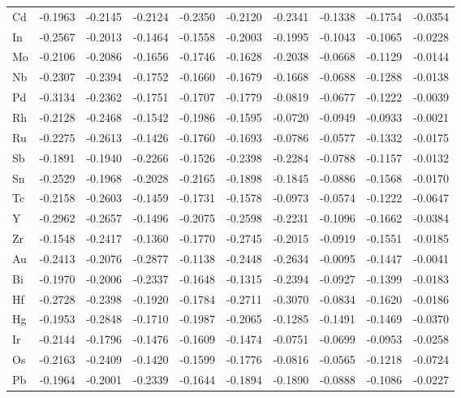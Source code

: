 \documentclass[a4paper, 12pt]{article}
\begin{document}
\begin{table}[htbp]
{\begin{tabular}{l *{9}{l}}
        Cd & -0.1963 & -0.2145 & -0.2124 & -0.2350 & -0.2120 & -0.2341 & -0.1338 & -0.1754 & -0.0354 \\
        In & -0.2567 & -0.2013 & -0.1464 & -0.1558 & -0.2003 & -0.1995 & -0.1043 & -0.1065 & -0.0228 \\
        Mo & -0.2106 & -0.2086 & -0.1656 & -0.1746 & -0.1628 & -0.2038 & -0.0668 & -0.1129 & -0.0144 \\
        Nb & -0.2307 & -0.2394 & -0.1752 & -0.1660 & -0.1679 & -0.1668 & -0.0688 & -0.1288 & -0.0138 \\
        Pd & -0.3134 & -0.2362 & -0.1751 & -0.1707 & -0.1779 & -0.0819 & -0.0677 & -0.1222 & -0.0039 \\
        Rh & -0.2128 & -0.2468 & -0.1542 & -0.1986 & -0.1595 & -0.0720 & -0.0949 & -0.0933 & -0.0021 \\
        Ru & -0.2275 & -0.2613 & -0.1426 & -0.1760 & -0.1693 & -0.0786 & -0.0577 & -0.1332 & -0.0175 \\
        Sb & -0.1891 & -0.1940 & -0.2266 & -0.1526 & -0.2398 & -0.2284 & -0.0788 & -0.1157 & -0.0132 \\
        Sn & -0.2529 & -0.1968 & -0.2028 & -0.2165 & -0.1898 & -0.1845 & -0.0886 & -0.1568 & -0.0170 \\
        Tc & -0.2158 & -0.2603 & -0.1459 & -0.1731 & -0.1578 & -0.0973 & -0.0574 & -0.1222 & -0.0647 \\
        Y  & -0.2962 & -0.2657 & -0.1496 & -0.2075 & -0.2598 & -0.2231 & -0.1096 & -0.1662 & -0.0384 \\
        Zr & -0.1548 & -0.2417 & -0.1360 & -0.1770 & -0.2745 & -0.2015 & -0.0919 & -0.1551 & -0.0185 \\
        Au & -0.2413 & -0.2076 & -0.2877 & -0.1138 & -0.2448 & -0.2634 & -0.0095 & -0.1447 & -0.0041 \\
        Bi & -0.1970 & -0.2006 & -0.2337 & -0.1648 & -0.1315 & -0.2394 & -0.0927 & -0.1399 & -0.0183 \\
        Hf & -0.2728 & -0.2398 & -0.1920 & -0.1784 & -0.2711 & -0.3070 & -0.0834 & -0.1620 & -0.0186 \\
        Hg & -0.1953 & -0.2848 & -0.1710 & -0.1987 & -0.2065 & -0.1285 & -0.1491 & -0.1469 & -0.0370 \\
        Ir & -0.2144 & -0.1796 & -0.1476 & -0.1609 & -0.1474 & -0.0751 & -0.0699 & -0.0953 & -0.0258 \\
        Os & -0.2163 & -0.2409 & -0.1420 & -0.1599 & -0.1776 & -0.0816 & -0.0565 & -0.1218 & -0.0724 \\
        Pb & -0.1964 & -0.2001 & -0.2339 & -0.1644 & -0.1894 & -0.1890 & -0.0888 & -0.1086 & -0.0227 \\

\end{tabular}}
\end{table}
\end{document}
